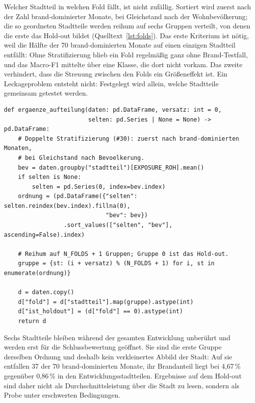 Welcher Stadtteil in welchen Fold fällt, ist nicht zufällig. Sortiert wird
zuerst nach der Zahl brand-dominierter Monate, bei Gleichstand nach der
Wohnbevölkerung; die so geordneten Stadtteile werden reihum auf sechs Gruppen
verteilt, von denen die erste das Hold-out bildet (Quelltext~\ref{lst:folds}).
Das erste Kriterium ist nötig, weil die Hälfte der 70 brand-dominierten Monate
auf einen einzigen Stadtteil entfällt: Ohne Stratifizierung blieb ein Fold
regelmäßig ganz ohne Brand-Testfall, und das Macro-F1 mittelte über eine
Klasse, die dort nicht vorkam. Das zweite verhindert, dass die Streuung
zwischen den Folds ein Größeneffekt ist. Ein Leckageproblem entsteht nicht:
Festgelegt wird allein, welche Stadtteile gemeinsam getestet werden.

\begin{lstlisting}[style=pythonstil,
  label={lst:folds},
  caption={Fold-Zuteilung mit doppelter Stratifizierung
           (\texttt{prep/s2\_datensaetze.py}, Z.~61--93, gekürzt)}]
def ergaenze_aufteilung(daten: pd.DataFrame, versatz: int = 0,
                        selten: pd.Series | None = None) -> pd.DataFrame:
    # Doppelte Stratifizierung (#30): zuerst nach brand-dominierten Monaten,
    # bei Gleichstand nach Bevoelkerung.
    bev = daten.groupby("stadtteil")[EXPOSURE_ROH].mean()
    if selten is None:
        selten = pd.Series(0, index=bev.index)
    ordnung = (pd.DataFrame({"selten": selten.reindex(bev.index).fillna(0),
                             "bev": bev})
                 .sort_values(["selten", "bev"], ascending=False).index)

    # Reihum auf N_FOLDS + 1 Gruppen; Gruppe 0 ist das Hold-out.
    gruppe = {st: (i + versatz) % (N_FOLDS + 1) for i, st in enumerate(ordnung)}

    d = daten.copy()
    d["fold"] = d["stadtteil"].map(gruppe).astype(int)
    d["ist_holdout"] = (d["fold"] == 0).astype(int)
    return d
\end{lstlisting}

Sechs Stadtteile bleiben während der gesamten Entwicklung unberührt und werden
erst für die Schlussbewertung geöffnet. Sie sind die erste Gruppe derselben
Ordnung und deshalb kein verkleinertes Abbild der Stadt: Auf sie entfallen 37
der 70 brand-dominierten Monate, ihr Brandanteil liegt bei 4,67\,\% gegenüber
0,86\,\% in den Entwicklungsstadtteilen. Ergebnisse auf dem Hold-out sind daher
nicht als Durchschnittsleistung über die Stadt zu lesen, sondern als Probe
unter erschwerten Bedingungen.

